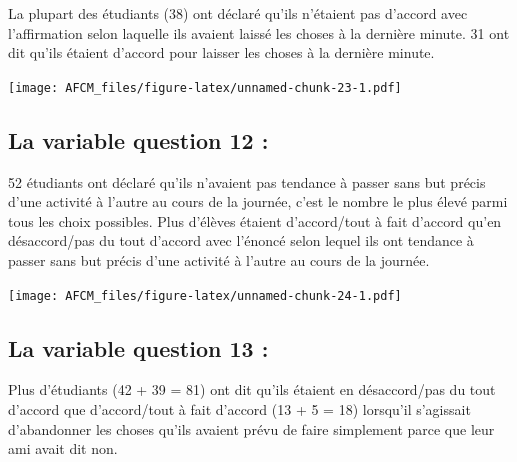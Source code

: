 \documentclass[
]{article}
\newenvironment{Shaded}{\begin{snugshade}}{\end{snugshade}}
\newcommand{\FunctionTok}[1]{\textcolor[rgb]{0.00,0.00,0.00}{#1}}
\newcommand{\NormalTok}[1]{#1}
\newcommand{\SpecialCharTok}[1]{\textcolor[rgb]{0.00,0.00,0.00}{#1}}
\newcommand{\StringTok}[1]{\textcolor[rgb]{0.31,0.60,0.02}{#1}}
\begin{document}
La plupart des étudiants (38) ont déclaré qu'ils n'étaient pas d'accord
avec l'affirmation selon laquelle ils avaient laissé les choses à la
dernière minute. 31 ont dit qu'ils étaient d'accord pour laisser les
choses à la dernière minute.

\begin{Shaded}
\end{Shaded}

\texttt{[image: AFCM\_files/figure-latex/unnamed-chunk-23-1.pdf]}

\hypertarget{la-variable-question-12}{%
\subsection{La variable question 12 :}\label{la-variable-question-12}}

52 étudiants ont déclaré qu'ils n'avaient pas tendance à passer sans but
précis d'une activité à l'autre au cours de la journée, c'est le nombre
le plus élevé parmi tous les choix possibles. Plus d'élèves étaient
d'accord/tout à fait d'accord qu'en désaccord/pas du tout d'accord avec
l'énoncé selon lequel ils ont tendance à passer sans but précis d'une
activité à l'autre au cours de la journée.

\begin{Shaded}
\end{Shaded}

\texttt{[image: AFCM\_files/figure-latex/unnamed-chunk-24-1.pdf]}

\hypertarget{la-variable-question-13}{%
\subsection{La variable question 13 :}\label{la-variable-question-13}}

Plus d'étudiants (42 + 39 = 81) ont dit qu'ils étaient en désaccord/pas
du tout d'accord que d'accord/tout à fait d'accord (13 + 5 = 18)
lorsqu'il s'agissait d'abandonner les choses qu'ils avaient prévu de
faire simplement parce que leur ami avait dit non.
\end{document}
